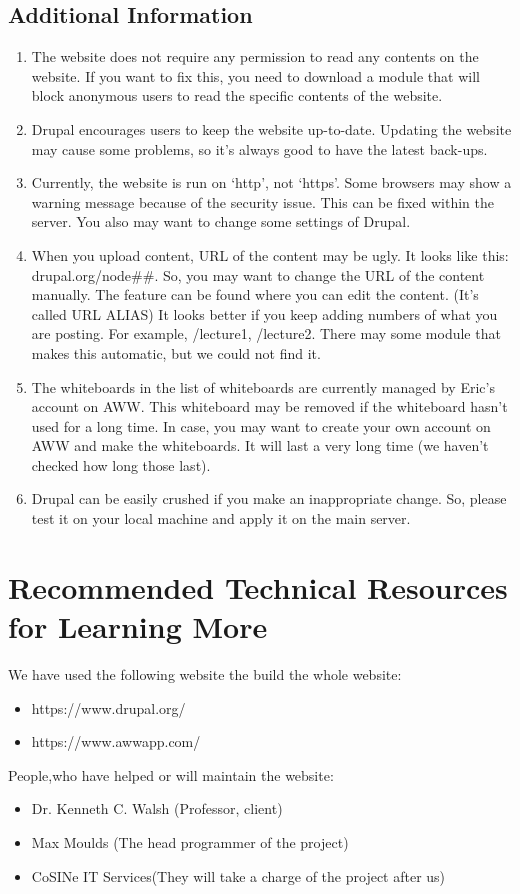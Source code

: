 \documentclass[10pt]{article}
\begin{document}
    \subsection{Additional Information}
        \begin{enumerate}
            \item The website does not require any permission to read any contents on the website. If you want to fix this, you need to download a module that will block anonymous users to read the specific contents of the website.
            \item Drupal encourages users to keep the website up-to-date. Updating the website may cause some problems, so it’s always good to have the latest back-ups.
            \item Currently, the website is run on `http’, not `https’. Some browsers may show a warning message because of the security issue. This can be fixed within the server. You also may want to change some settings of Drupal.

            \item When you upload content, URL of the content may be ugly. It looks like this: drupal.org/node\#\#. So, you may want to change the URL of the content manually. The feature can be found where you can edit the content. (It’s called URL ALIAS) It looks better if you keep adding numbers of what you are posting. For example, /lecture1, /lecture2. There may some module that makes this automatic, but we could not find it.

            \item The whiteboards in the list of whiteboards are currently managed by Eric’s account on AWW. This whiteboard may be removed if the whiteboard hasn’t used for a long time. In case, you may want to create your own account on AWW and make the whiteboards. It will last a very long time (we haven’t checked how long those last).
            \item Drupal can be easily crushed if you make an inappropriate change. So, please test it on your local machine and apply it on the main server.
        \end{enumerate}
\clearpage
\section{Recommended Technical Resources for Learning More}
        We have used the following website the build the whole website:
        \begin{itemize}
            \item https://www.drupal.org/
            \item https://www.awwapp.com/
        \end{itemize}
        \medskip
        People,who have helped or will maintain the website:
                \begin{itemize}
            \item Dr. Kenneth C. Walsh (Professor, client)
            \item Max Moulds (The head programmer of the project)
            \item CoSINe IT Services(They will take a charge of the project after us)
        \end{itemize}
\end{document}

